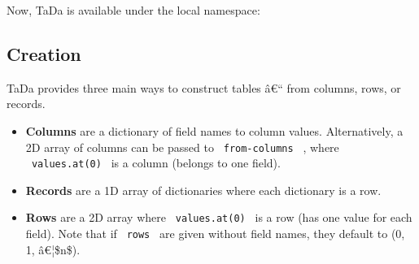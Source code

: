 Now, TaDa is available under the local namespace:

\begin{Shaded}
\begin{Highlighting}[]
\end{Highlighting}
\end{Shaded}

\subsection{Creation}\label{creation}

TaDa provides three main ways to construct tables â€`` from columns,
rows, or records.

\begin{itemize}
\item
  \textbf{Columns} are a dictionary of field names to column values.
  Alternatively, a 2D array of columns can be passed to
  \texttt{\ from-columns\ } , where \texttt{\ values.at(0)\ } is a
  column (belongs to one field).
\item
  \textbf{Records} are a 1D array of dictionaries where each dictionary
  is a row.
\item
  \textbf{Rows} are a 2D array where \texttt{\ values.at(0)\ } is a row
  (has one value for each field). Note that if \texttt{\ rows\ } are
  given without field names, they default to (0, 1, â€¦\$n\$).
\end{itemize}

\begin{Shaded}
\begin{Highlighting}[]
\NormalTok{)}
\NormalTok{)}
\NormalTok{)}


\end{Highlighting}
\end{Shaded}

